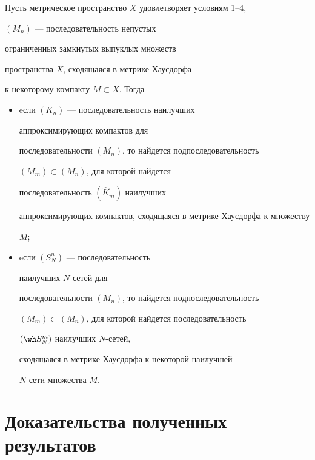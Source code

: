 \begin{cor}


Пусть метрическое пространство $X$ удовлетворяет условиям 1--4,


$(M_{n})$ --- последовательность непустых 


ограниченных замкнутых выпуклых множеств 


пространства $X$, сходящаяся в метрике Хаусдорфа 


к некоторому компакту $M \subset X$. Тогда


\begin{itemize}


\item[A.] eсли $(K_{n})$ --- последовательность наилучших 


аппроксимирующих компактов для


последовательности $(M_{n})$, то найдется подпоследовательность 


$(M_{m}) \subset (M_{n})$, для которой найдется 


последовательность $(\hat K_{m})$ наилучших 


аппроксимирующих компактов, сходящаяся в метрике Хаусдорфа к множеству


$M$; 


\item[B.] eсли $(S_{N}^{n})$ --- последовательность 


наилучших $N$-сетей для


последовательности $(M_{n})$, то найдется подпоследовательность 


$(M_{m}) \subset (M_{n})$, для которой найдется последовательность 


$(\wh S_{N}^{m})$ наилучших $N$-сетей, 


сходящаяся в метрике Хаусдорфа к некоторой наилучшей 


$N$-сети множества $M$.


\end{itemize}


\end{cor}








\section{Доказательства полученных результатов}








